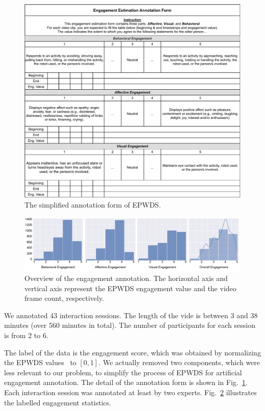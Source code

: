 \documentclass[VANCOUVER,STIX1COL]{WileyNJD-v2}
\begin{document}
\begin{figure}[t]
  \centering
  \includegraphics[width=\linewidth]{assets/annotation_form.drawio}
  \caption{The simplified annotation form of EPWDS.}
  \label{f:annotation_form}
\end{figure}


\begin{figure}[t]
  \centering
  \includegraphics[width=0.9\linewidth]{assets/label_overview}
  \caption{Overview of the engagement annotation. The horizontal axis and vertical axis represent the EPWDS engagement value and the video frame count, respectively.}
  \label{f:label_overview}
\end{figure}

We annotated 43 interaction sessions. The length of the vide is between 3 and 38 minutes (over 560 minutes in total). The number of participants for each session is from 2 to 6.

The label of the data is the engagement score, which was obtained by normalizing the EPWDS values~\cite{Jones2018Engagement} to $[0, 1]$. We actually removed two components, which were less relevant to our problem, to simplify the process of EPWDS for artificial engagement annotation. The detail of the annotation form is shown in Fig.~\ref{f:annotation_form}. Each interaction session was annotated at least by two experts. Fig.~\ref{f:label_overview} illustrates the labelled engagement statistics.
\end{document}
